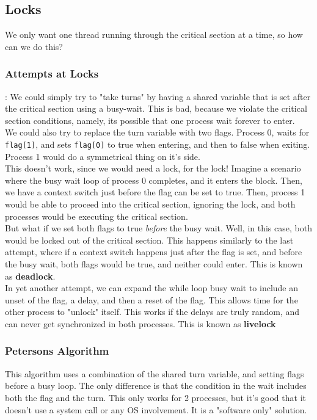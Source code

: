 \documentclass[12pt]{article}
\theoremstyle{definition}
\begin{document}
\subsection{Locks}
We only want one thread running through the critical section at a time, so how can we do this?

\subsubsection{Attempts at Locks}:
We could simply try to "take turns" by having a shared variable that is set after the critical section using a busy-wait. This is bad, because we violate the critical section conditions, namely, its possible that one process wait forever to enter.
\\ \linebreak
We could also try to replace the turn variable with two flags. Process 0, waits for \texttt{flag[1]}, and sets \texttt{flag[0]} to true when entering, and then to false when exiting. Process 1 would do a symmetrical thing on it's side.
\\ \linebreak
This doesn't work, since we would need a lock, for the lock! Imagine a scenario where the busy wait loop of process 0 completes, and it enters the block. Then, we have a context switch just before the flag can be set to true. Then, process 1 would be able to proceed into the critical section, ignoring the lock, and both processes would be executing the critical section.
\\ \linebreak
But what if we set both flags to true \textit{before} the busy wait. Well, in this case, both would be locked out of the critical section. This happens similarly to the last attempt, where if a context switch happens just after the flag is set, and before the busy wait, both flags would be true, and neither could enter. This is known as \textbf{deadlock}.
\\ \linebreak
In yet another attempt, we can expand the while loop busy wait to include an unset of the flag, a delay, and then a reset of the flag. This allows time for the other process to "unlock" itself. This works if the delays are truly random, and can never get synchronized in both processes. This is known as \textbf{livelock}

\subsubsection{Petersons Algorithm}
This algorithm uses a combination of the shared turn variable, and setting flags before a busy loop. The only difference is that the condition in the wait includes both the flag and the turn. This only works for 2 processes, but it's good that it doesn't use a system call or any OS involvement. It is a "software only" solution.
\end{document}
